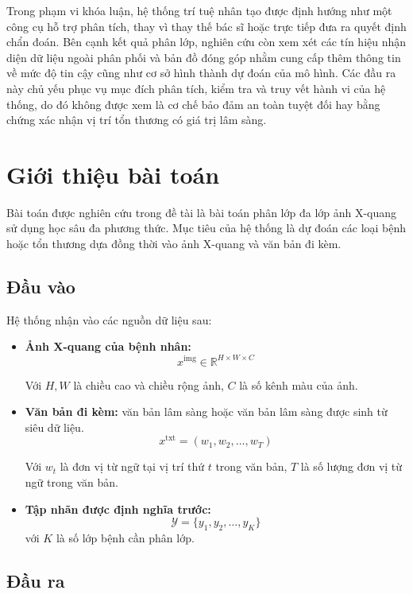 Trong phạm vi khóa luận, hệ thống trí tuệ nhân tạo được định hướng như một công cụ hỗ trợ phân tích, thay vì thay thế bác sĩ hoặc trực tiếp đưa ra quyết định chẩn đoán. Bên cạnh kết quả phân lớp, nghiên cứu còn xem xét các tín hiệu nhận diện dữ liệu ngoài phân phối và bản đồ đóng góp nhằm cung cấp thêm thông tin về mức độ tin cậy cũng như cơ sở hình thành dự đoán của mô hình. Các đầu ra này chủ yếu phục vụ mục đích phân tích, kiểm tra và truy vết hành vi của hệ thống, do đó không được xem là cơ chế bảo đảm an toàn tuyệt đối hay bằng chứng xác nhận vị trí tổn thương có giá trị lâm sàng.

\pagebreak

\section{Giới thiệu bài toán}
\label{sec:ch1_problem_def}

Bài toán được nghiên cứu trong đề tài là bài toán phân lớp đa lớp ảnh X-quang sử dụng học sâu đa phương thức. Mục tiêu của hệ thống là dự đoán các loại bệnh hoặc tổn thương dựa đồng thời vào ảnh X-quang và văn bản đi kèm.
\subsection{Đầu vào}
Hệ thống nhận vào các nguồn dữ liệu sau:
\begin{itemize}
    \item \textbf{Ảnh X-quang của bệnh nhân:}
    \[ x^{\mathrm{img}} \in \mathbb{R}^{H \times W \times C} \] 

    Với $H, W$ là chiều cao và chiều rộng ảnh, $C$ là số kênh màu của ảnh.

    \item \textbf{Văn bản đi kèm:} văn bản lâm sàng hoặc văn bản lâm sàng được sinh từ siêu dữ liệu.
    \[ x^{\mathrm{txt}} = (w_1, w_2, \ldots, w_T) \] 

    Với $w_t$ là đơn vị từ ngữ tại vị trí thứ $t$ trong văn bản, $T$ là số lượng đơn vị từ ngữ trong văn bản.

    \item \textbf{Tập nhãn được định nghĩa trước:}
    \[ \mathcal{Y} = \{y_1, y_2, \ldots, y_K\} \] với $K$ là số lớp bệnh cần phân lớp.
\end{itemize}

\pagebreak
\subsection{Đầu ra}

